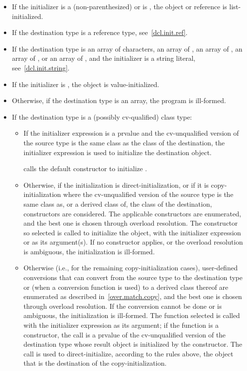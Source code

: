 \begin{itemize}
\item
If the initializer is a (non-parenthesized) 
or is \tcode{=} , the object or reference
is list-initialized.
\item
If the destination type is a reference type, see~\ref{dcl.init.ref}.
\item
If the destination type is an array of characters,
an array of ,
an array of ,
an array of ,
or an array of
,
and the initializer is a string literal, see~\ref{dcl.init.string}.
\item If the initializer is \tcode{()}, the object is value-initialized.
\item
Otherwise, if the destination type is an array, the program is ill-formed.
\item
If the destination type is a (possibly cv-qualified) class type:

\begin{itemize}
\item
If the initializer expression is a prvalue
and the cv-unqualified version of the source type
is the same class as the class of the destination,
the initializer expression is used to initialize the destination object.
\begin{example}
 calls the  default constructor to initialize .
\end{example}
\item
Otherwise, if the initialization is direct-initialization,
or if it is copy-initialization where the cv-unqualified version of the source
type is the same class as, or a derived class of, the class of the destination,
constructors are considered.
The applicable constructors
are enumerated, and the best one is chosen
through overload resolution.
The constructor so selected
is called to initialize the object, with the initializer
expression or  as its argument(s).
If no constructor applies, or the overload resolution is
ambiguous, the initialization is ill-formed.
\item
Otherwise (i.e., for the remaining copy-initialization cases),
user-defined conversions that can convert from the
source type to the destination type or (when a conversion function
is used) to a derived class thereof are enumerated as described in~\ref{over.match.copy},
and the best one is chosen through overload resolution.
If the conversion cannot be done or
is ambiguous, the initialization is ill-formed.  The function
selected is called with the initializer expression as its
argument; if the function is a constructor, the call is a prvalue
of the cv-unqualified version of the
destination type whose result object is initialized by the constructor.
The call is used
to direct-initialize, according to the rules above, the object
that is the destination of the copy-initialization.
\end{itemize}


\end{itemize}
